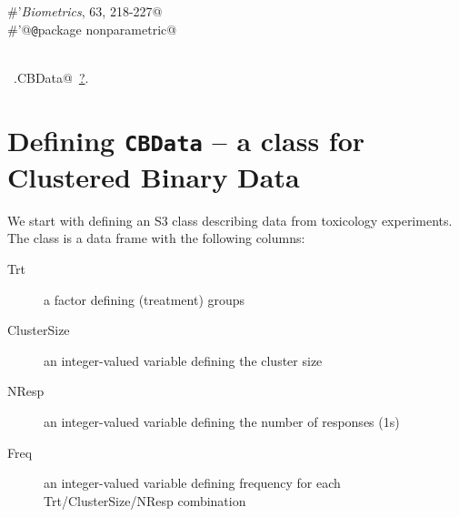 \documentclass[reqno]{amsart}
\renewcommand{\NWlink}[2]{\hyperlink{#1}{#2}}
\begin{document}
\begin{flushleft}
\begin{list}{}{}
\mbox{}\verb@#'\emph{Biometrics}, 63, 218-227@\\
\mbox{}\verb@#'@{\tt @}\verb@keywords package nonparametric@\\
\mbox{}\verb@NULL@\\
\mbox{}\verb@@{\NWsep}
\end{list}
\vspace{-1.5ex}
\footnotesize
\begin{list}{}{\setlength{\itemsep}{-\parsep}\setlength{\itemindent}{-\leftmargin}}
\item \NWtxtIdentsUsed\nobreak\  \verb@ran.CBData@\nobreak\ \NWlink{nuweb?}{?}.
\item{}
\end{list}
\vspace{4ex}
\end{flushleft}
\section{Defining \texttt{CBData} -- a class for \textbf{C}lustered \textbf{B}inary \textbf{Data}}
We start with defining an S3 class describing data from toxicology experiments. The
class is a data frame with the following columns:

\begin{description}
\item[Trt] a factor defining (treatment) groups
\item[ClusterSize] an integer-valued variable defining the cluster size
\item[NResp] an integer-valued variable defining the number of responses (1s)
\item[Freq]  an integer-valued  variable defining frequency for each
Trt/ClusterSize/NResp combination
\end{description}
\end{document}
